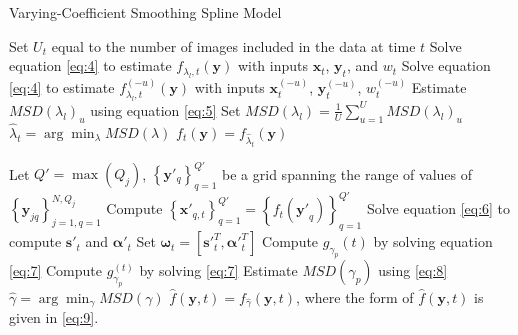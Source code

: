 \documentclass[11pt,reqno]{article}
\theoremstyle{definition}
\begin{document}

\LinesNumbered

\begin{algorithm}
\caption{Varying-Coefficient Smoothing Spline Model}\label{alg:varying_spline}

 {
  Set $U_t$ equal to the number of images included in the data at time $t$\;
   {
    Solve equation \ref{eq:4} to estimate $f_{\lambda_l, t}(\mathbf{y})$ with inputs $\mathbf{x}_t$, $\mathbf{y}_t$, and $w_t$\;
     {
      Solve equation \ref{eq:4} to estimate $f^{(-u)}_{\lambda_l, t}(\mathbf{y})$ with inputs $\mathbf{x}^{(-u)}_t$, $\mathbf{y}^{(-u)}_t$, $w^{(-u)}_t$\;
      Estimate $MSD(\lambda_{l})_u$ using equation \ref{eq:5}\;
    }
    Set $MSD(\lambda_l) = \frac{1}{U}\sum_{u=1}^{U}MSD(\lambda_l)_u$\;
  }
  $\hat{\lambda}_t = \arg \min_{\lambda} MSD(\lambda)$\;
  $f_t(\mathbf{y}) = f_{\hat{\lambda}_t}(\mathbf{y})$\;
}

  Let $Q' = \max(Q_{j})$, $\left\{\mathbf{y}'_{q}\right\}_{q=1}^{Q'}$ be a grid spanning the range of values of $\left\{\mathbf{y}_{jq}\right\}_{j=1, q=1}^{N, Q_j}$\;
   {
    Compute $\left\{\mathbf{x'}_{q, t}\right\}_{q=1}^{Q'} = \left\{f_t(\mathbf{y'}_q)\right\}_{q=1}^{Q'}$\;
    Solve equation \ref{eq:6} to compute $\mathbf{s'}_t$ and $\mathbf{\alpha'}_t$\;
    Set $\mathbf{\omega}_t = \left[\mathbf{s'}_t^{T}, \mathbf{\alpha'}_t^{T}\right]$\;
  }
   {
    Compute $g_{\gamma_p}(t)$ by solving equation \ref{eq:7}\;
     {
      Compute $g_{\gamma_p}^{(t)}$ by solving \ref{eq:7}\;
    }
    Estimate $MSD(\gamma_p)$ using \ref{eq:8}\;
  }
  $\hat{\gamma} = \arg \min_{\gamma} MSD(\gamma)$\;
  $\hat{f}(\mathbf{y}, t) = f_{\hat{\gamma}}(\mathbf{y}, t)$, where the form of $\hat{f}(\mathbf{y}, t)$ is given in \ref{eq:9}.
\end{algorithm}
\end{document}
